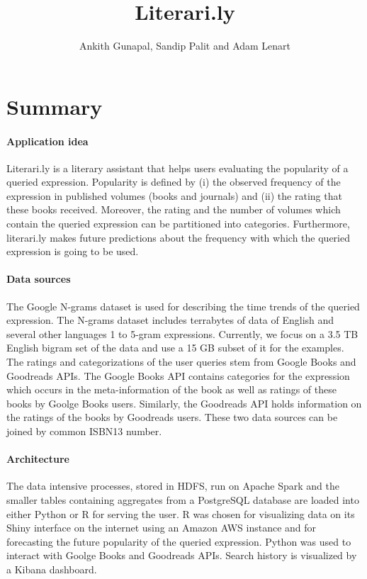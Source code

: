 \documentclass[12pt,letterpaper]{article}
\title{\Large Literari.ly}
\author{Ankith Gunapal, Sandip Palit and Adam Lenart}
\begin{document}
\maketitle


\section{Summary}

\paragraph{Application idea} Literari.ly is a literary assistant that helps users evaluating the popularity of a queried expression. Popularity is defined by (i) the observed frequency of the expression in published volumes (books and journals) 
and (ii) the rating that these books received. Moreover, the rating and the number of volumes which contain the queried expression can be partitioned into categories. Furthermore, literari.ly makes future predictions
about the frequency with which the queried expression is going to be used.

\paragraph{Data sources} The Google N-grams dataset is used for describing the time trends of the queried expression. The N-grams dataset includes terrabytes of data of English and several other languages 1 to 5-gram expressions.
Currently, we focus on a 3.5 TB English bigram set of the data and use a 15 GB subset of it for the examples. The ratings and categorizations of the user queries stem from Google Books and Goodreads APIs. The Google Books API contains categories for the expression 
which occurs in the meta-information of the book as well as ratings of these books by Goolge Books users. Similarly, the Goodreads API holds information on the ratings of the books by Goodreads users. These two
data sources can be joined by common ISBN13 number.

\paragraph{Architecture} The data intensive processes, stored in HDFS, run on Apache Spark and the smaller tables containing aggregates from a PostgreSQL database are loaded into either Python or R for serving 
the user. R was chosen for visualizing data on its Shiny interface on the internet using an Amazon AWS instance and for forecasting the future popularity of the queried expression. Python was used to interact with Goolge Books
and Goodreads APIs. Search history is visualized by a Kibana dashboard.
\end{document}
